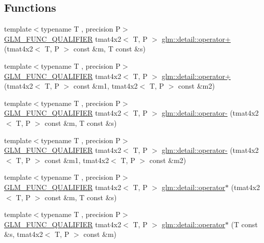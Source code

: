 \subsection*{Functions}
\begin{DoxyCompactItemize}
\item 
{\footnotesize template$<$typename T , precision P$>$ }\\\hyperlink{setup_8hpp_a33fdea6f91c5f834105f7415e2a64407}{G\+L\+M\+\_\+\+F\+U\+N\+C\+\_\+\+Q\+U\+A\+L\+I\+F\+I\+ER} tmat4x2$<$ T, P $>$ \hyperlink{namespaceglm_1_1detail_a9b96a595d78993eede9ed746bdbcc477}{glm\+::detail\+::operator+} (tmat4x2$<$ T, P $>$ const \&m, T const \&s)
\item 
{\footnotesize template$<$typename T , precision P$>$ }\\\hyperlink{setup_8hpp_a33fdea6f91c5f834105f7415e2a64407}{G\+L\+M\+\_\+\+F\+U\+N\+C\+\_\+\+Q\+U\+A\+L\+I\+F\+I\+ER} tmat4x2$<$ T, P $>$ \hyperlink{namespaceglm_1_1detail_afec79a9a68c63dd87347b847483bf7e0}{glm\+::detail\+::operator+} (tmat4x2$<$ T, P $>$ const \&m1, tmat4x2$<$ T, P $>$ const \&m2)
\item 
{\footnotesize template$<$typename T , precision P$>$ }\\\hyperlink{setup_8hpp_a33fdea6f91c5f834105f7415e2a64407}{G\+L\+M\+\_\+\+F\+U\+N\+C\+\_\+\+Q\+U\+A\+L\+I\+F\+I\+ER} tmat4x2$<$ T, P $>$ \hyperlink{namespaceglm_1_1detail_a6fafaf7bac5d6d75d7ca8e7d248f3d33}{glm\+::detail\+::operator-\/} (tmat4x2$<$ T, P $>$ const \&m, T const \&s)
\item 
{\footnotesize template$<$typename T , precision P$>$ }\\\hyperlink{setup_8hpp_a33fdea6f91c5f834105f7415e2a64407}{G\+L\+M\+\_\+\+F\+U\+N\+C\+\_\+\+Q\+U\+A\+L\+I\+F\+I\+ER} tmat4x2$<$ T, P $>$ \hyperlink{namespaceglm_1_1detail_a4e2426baf3251ad9ba403d4c1be53dbd}{glm\+::detail\+::operator-\/} (tmat4x2$<$ T, P $>$ const \&m1, tmat4x2$<$ T, P $>$ const \&m2)
\item 
{\footnotesize template$<$typename T , precision P$>$ }\\\hyperlink{setup_8hpp_a33fdea6f91c5f834105f7415e2a64407}{G\+L\+M\+\_\+\+F\+U\+N\+C\+\_\+\+Q\+U\+A\+L\+I\+F\+I\+ER} tmat4x2$<$ T, P $>$ \hyperlink{namespaceglm_1_1detail_a653f525e93851a468368d4d63d8dc55e}{glm\+::detail\+::operator$\ast$} (tmat4x2$<$ T, P $>$ const \&m, T const \&s)
\item 
{\footnotesize template$<$typename T , precision P$>$ }\\\hyperlink{setup_8hpp_a33fdea6f91c5f834105f7415e2a64407}{G\+L\+M\+\_\+\+F\+U\+N\+C\+\_\+\+Q\+U\+A\+L\+I\+F\+I\+ER} tmat4x2$<$ T, P $>$ \hyperlink{namespaceglm_1_1detail_a48f885c99b950d583c33fe56cf76583e}{glm\+::detail\+::operator$\ast$} (T const \&s, tmat4x2$<$ T, P $>$ const \&m)

\end{DoxyCompactItemize}
